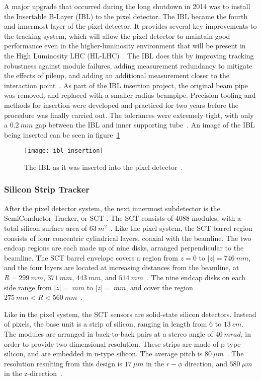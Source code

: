 A major upgrade that occurred during the long shutdown in 2014 was to install the Insertable B-Layer (IBL) to the pixel detector.
The IBL became the fourth and innermost layer of the pixel detector.
It provides several key improvements to the tracking system, which will allow the pixel detector to maintain good performance even in the higher-luminosity environment that will be present in the High Luminosity LHC (HL-LHC)~\cite{ibl-tdr}.
The IBL does this by improving tracking robustness against module failures, adding measurement redundancy to mitigate the effects of pileup, and adding an additional measurement closer to the interaction point~\cite{ibl-tdr}.
As part of the IBL insertion project, the original beam pipe was removed, and replaced with a smaller-radius beampipe.
Precision tooling and methods for insertion were developed and practiced for two years before the procedure was finally carried out.
The tolerances were extremely tight, with only a $0.2~mm$ gap between the IBL and inner supporting tube~\cite{ibl-website}.
An image of the IBL being inserted can be seen in figure~\ref{fig:ibl_insertion}

\begin{figure}[!ht]\centering
\texttt{[image: ibl\_insertion]}
\caption{The IBL as it was inserted into the pixel detector~\cite{ibl-website}.}
\label{fig:ibl_insertion}
\end{figure}

\subsubsection{Silicon Strip Tracker}\label{subsubsec:sct}

After the pixel detector system, the next innermost subdetector is the SemiConductor Tracker, or SCT .
The SCT consists of 4088 modules, with a total silicon surface area of $63~m^2$~\cite{atlas-detector-2008}.
Like the pixel system, the SCT barrel region consists of four concentric cylindrical layers, coaxial with the beamline.
The two endcap regions are each made up of nine disks, arranged perpendicular to the beamline.
The SCT barrel envelope covers a region from $z = 0$ to $|z|  = 746~mm$, and the four layers are located at increasing distances from the beamline, at $R = 299~mm$, $371~mm$, $443~mm$, and $514~mm$~\cite{sct-barrel-2006}.
The nine endcap disks on each side range from $|z| = ~mm$ to $|z| = ~mm$, and cover the region $275~mm < R < 560~mm$~\cite{atlas-detector-2008}.

Like in the pixel system, the SCT sensors are solid-state silicon detectors.
Instead of pixels, the base unit is a strip of silicon, ranging in length from $6$ to $13~cm$.
The modules are arranged in back-to-back pairs at a stereo angle of $40~mrad$, in order to provide two-dimensional resolution.
These strips are made of p-type silicon, and are embedded in n-type silicon.
The average pitch is $80~\mu m$~\cite{sct-2010}.
The resolution resulting from this design is $17~\mu m$ in the $r-\phi$ direction, and $580~\mu m$ in the z-direction~\cite{sct-2010}.

